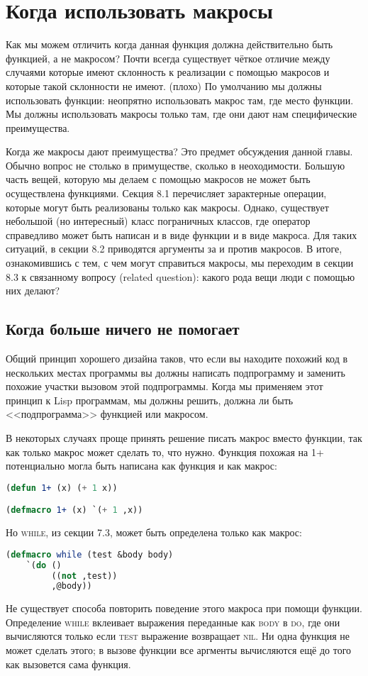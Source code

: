 \documentclass[12pt, a4paper]{article} %
\begin{document}
\section{Когда использовать макросы}

Как мы можем отличить когда данная функция должна действительно быть функцией, а не макросом? Почти всегда существует чёткое отличие между случаями которые имеют склонность к реализации с помощью макросов и которые такой склонности не имеют. (плохо) По умолчанию мы должны использовать функции: неопрятно использовать макрос там, где место функции. Мы должны использовать макросы только там, где они дают нам специфические преимущества. 

Когда же макросы дают преимущества? Это предмет обсуждения данной главы. Обычно вопрос не столько в примуществе, сколько в неоходимости. Большую часть вещей, которую мы делаем с помощью макросов не может быть осуществлена функциями. Секция 8.1 перечисляет зарактерные операции, которые могут быть реализованы только как макросы. Однако, существует небольшой (но интересный) класс пограничных классов, где оператор справедливо может быть написан и в виде функции и в виде макроса. Для таких ситуаций, в секции 8.2 приводятся аргументы за и против макросов. В итоге, ознакомившись с тем, с чем могут справиться макросы, мы переходим в секции 8.3 к связанному вопросу (related question): какого рода вещи люди с помощью них делают?

\subsection{Когда больше ничего не помогает}

Общий принцип хорошего дизайна таков, что если вы находите похожий код в нескольких местах программы вы должны написать подпрограмму и заменить похожие участки вызовом этой подпрограммы. Когда мы применяем этот принцип к Lisp программам, мы должны решить, должна ли быть <<подпрограмма>> функцией или макросом.

В некоторых случаях проще принять решение писать макрос вместо функции, так как только макрос может сделать то, что нужно. Функция похожая на \textsc{1+} потенциально могла быть написана как функция и как макрос:
\begin{lstlisting}[language=Lisp]
(defun 1+ (x) (+ 1 x))

(defmacro 1+ (x) `(+ 1 ,x))
\end{lstlisting}
Но \textsc{while}, из секции 7.3, может быть определена только как макрос:
\begin{lstlisting}[language=Lisp]
(defmacro while (test &body body)
    `(do ()
         ((not ,test))
         ,@body))
\end{lstlisting}
Не существует способа повторить поведение этого макроса при помощи функции. Определение \textsc{while} вклеивает выражения переданные как \textsc{body} в \textsc{do}, где они вычисляются только если \textsc{test} выражение возвращает \textsc{nil}. Ни одна функция не может сделать этого; в вызове функции все аргменты вычисляются ещё до того как вызовется сама функция.
\end{document}
